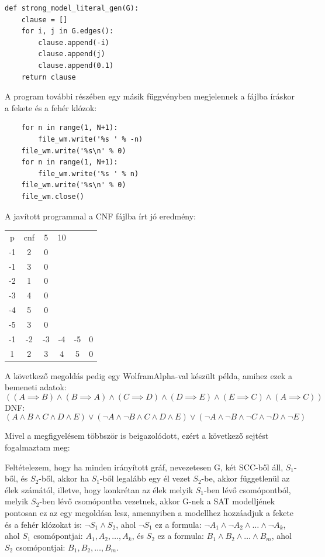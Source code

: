 \documentclass[
]{thesis-ekf}
\theoremstyle{definition}
\theoremstyle{remark}
\begin{document}
	\begin{lstlisting}
def strong_model_literal_gen(G):
	clause = []
	for i, j in G.edges():
		clause.append(-i)
		clause.append(j)
		clause.append(0.1)
	return clause	
	\end{lstlisting}

A program további részében egy másik függvényben megjelennek a fájlba íráskor a fekete és a fehér klózok:
	\begin{lstlisting}
	for n in range(1, N+1):
		file_wm.write('%s ' % -n)
	file_wm.write('%s\n' % 0)
	for n in range(1, N+1):
		file_wm.write('%s ' % n)
	file_wm.write('%s\n' % 0)
	file_wm.close()
	\end{lstlisting}	
	
	A javított programmal a \textsc{CNF} fájlba írt jó eredmény:

	\begin{tabular}{cccccc}
		p & cnf & 5 & 10 & &   \\
		-1&  2 &  0&   &   &   \\
		-1&  3 &  0&   &   &   \\
		-2&  1 &  0&   &   &   \\
		-3&  4 &  0&   &   &   \\
		-4&  5 &  0&   &   &   \\
		-5&  3 &  0&   &   &   \\
		-1& -2 & -3& -4& -5& 0 \\
		1&  2 &  3&  4&  5& 0 \\
	\end{tabular}

	A következő megoldás pedig egy WolframAlpha-val készült példa, amihez ezek a bemeneti adatok:
	\[ ((A\implies B)\wedge(B\implies A)\wedge(C\implies D)\wedge(D\implies E)\wedge(E\implies C)\wedge(A\implies C)) \]
	\textsc{DNF}:
	\[ (A\wedge B\wedge C\wedge D\wedge E)\vee (\neg A\wedge\neg B\wedge C\wedge D\wedge E)\vee (\neg A\wedge\neg B\wedge\neg C\wedge\neg D\wedge\neg E) \]
	
	Mivel a megfigyelésem többször is beigazolódott, ezért a következő sejtést fogalmaztam meg:
	
	Feltételezem, hogy ha minden irányított gráf, nevezetesen G, két \textsc{SCC}-ből áll, $ S_1 $-ből, és $ S_2 $-ből, akkor ha $ S_1 $-ből legalább egy él vezet $ S_2 $-be, akkor függetlenül az élek számától, illetve, hogy konkrétan az élek melyik $ S_1 $-ben lévő csomópontból, melyik $ S_2 $-ben lévő csomópontba vezetnek, akkor G-nek a \textsc{SAT} modelljének pontosan ez az egy megoldása lesz, amennyiben a modellhez hozzáadjuk a fekete és a fehér klózokat is: $ \neg S_1\wedge S_2 $, ahol $ \neg S_1 $ ez a formula: $\neg A_1 \wedge \neg A_2\wedge\dots\wedge\neg A_k$, ahol $ S_1 $ csomópontjai: $ A_1,A_2,\dots,A_k $, és $ S_2 $ ez a formula: $ B_1\wedge B_2\wedge\dots\wedge B_m $, ahol $ S_2 $ csomópontjai: $ B_1,B_2,\dots,B_m $.
	
\end{document}
